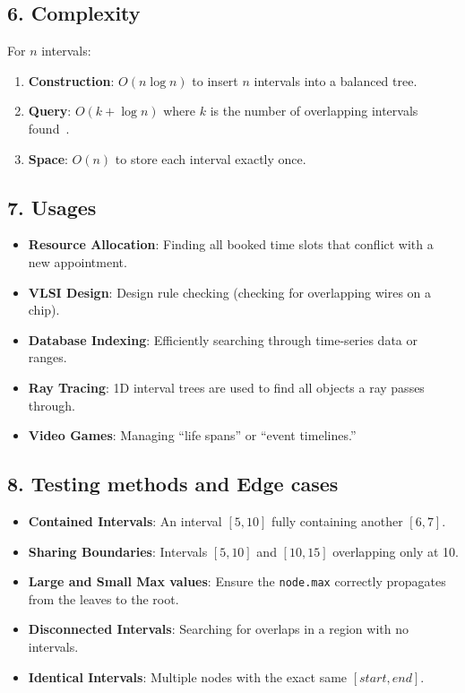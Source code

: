 \subsection{6. Complexity}
\begin{theorem}
\label{thm:it_complexity}
For $n$ intervals:
\begin{enumerate}
    \item \textbf{Construction}: $O(n \log n)$ to insert $n$ intervals into a balanced tree.
    \item \textbf{Query}: $O(k + \log n)$ where $k$ is the number of overlapping intervals found~\cite{edelsbrunner1980}.
    \item \textbf{Space}: $O(n)$ to store each interval exactly once.
\end{enumerate}
\end{theorem}

\subsection{7. Usages}
\begin{itemize}
    \item \textbf{Resource Allocation}: Finding all booked time slots that conflict with a new appointment.
    \item \textbf{VLSI Design}: Design rule checking (checking for overlapping wires on a chip).
    \item \textbf{Database Indexing}: Efficiently searching through time-series data or ranges.
    \item \textbf{Ray Tracing}: 1D interval trees are used to find all objects a ray passes through.
    \item \textbf{Video Games}: Managing ``life spans'' or ``event timelines.''
\end{itemize}

\subsection{8. Testing methods and Edge cases}
\begin{itemize}
    \item \textbf{Contained Intervals}: An interval $[5, 10]$ fully containing another $[6, 7]$.
    \item \textbf{Sharing Boundaries}: Intervals $[5, 10]$ and $[10, 15]$ overlapping only at 10.
    \item \textbf{Large and Small Max values}: Ensure the \texttt{node.max} correctly propagates from the leaves to the root.
    \item \textbf{Disconnected Intervals}: Searching for overlaps in a region with no intervals.
    \item \textbf{Identical Intervals}: Multiple nodes with the exact same $[start, end]$.
\end{itemize}

